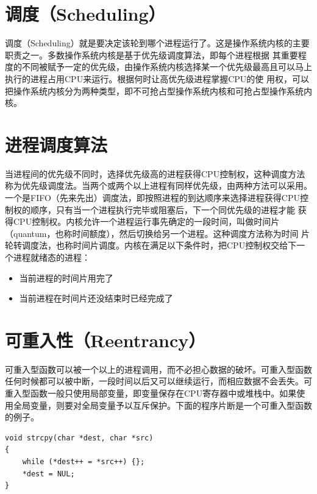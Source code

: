 \documentclass[a4paper,12pt]{report}
\begin{document}
\begin{appendix}
\section{ 调度（Scheduling）}
\begin{spacing}{1.5}

     调度（Scheduling）就是要决定该轮到哪个进程运行了。这是操作系统内核的主要职责之一。多数操作系统内核是基于优先级调度算法，即每个进程根据 其重要程度的不同被赋予一定的优先级，由操作系统内核选择某一个优先级最高且可以马上执行的进程占用CPU来运行。根据何时让高优先级进程掌握CPU的使 用权，可以把操作系统内核分为两种类型，即不可抢占型操作系统内核和可抢占型操作系统内核。
\end{spacing}

\section{ 进程调度算法}
\begin{spacing}{1.5}

      当进程间的优先级不同时，选择优先级高的进程获得CPU控制权，这种调度方法称为优先级调度法。当两个或两个以上进程有同样优先级，由两种方法可以采用。 一个是FIFO（先来先出）调度法，即按照进程的到达顺序来选择进程获得CPU控制权的顺序，只有当一个进程执行完毕或阻塞后，下一个同优先级的进程才能 获得CPU控制权。内核允许一个进程运行事先确定的一段时间，叫做时间片（quantum，也称时间额度），然后切换给另一个进程。这种调度方法称为时间 片轮转调度法，也称时间片调度。内核在满足以下条件时，把CPU控制权交给下一个进程就绪态的进程：
      \begin{itemize}
        \item  当前进程的时间片用完了
        \item 当前进程在时间片还没结束时已经完成了
      \end{itemize}
\end{spacing}


\section{ 可重入性（Reentrancy）}
\begin{spacing}{1.5}

        可重入型函数可以被一个以上的进程调用，而不必担心数据的破坏。可重入型函数任何时候都可以被中断，一段时间以后又可以继续运行，而相应数据不会丢失。可 重入型函数一般只使用局部变量，即变量保存在CPU寄存器中或堆栈中。如果使用全局变量，则要对全局变量予以互斥保护。下面的程序片断是一个可重入型函数 的例子。
 \begin{lstlisting}
void strcpy(char *dest, char *src)
{
    while (*dest++ = *src++) {};
    *dest = NUL;
}


\end{lstlisting}
\end{spacing}
\end{appendix}
\end{document}
